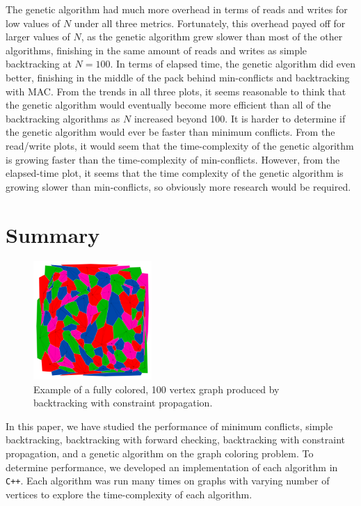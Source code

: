 \documentclass{article}
\begin{document}
		The genetic algorithm had much more overhead in terms of reads and writes for low values of $N$ under all three metrics. Fortunately, this overhead payed off for larger values of $N$, as the genetic algorithm grew slower than most of the other algorithms, finishing in the same amount of reads and writes as simple backtracking at $N=100$. In terms of elapsed time, the genetic algorithm did even better, finishing in the middle of the pack behind min-conflicts and backtracking with MAC. From the trends in all three plots, it seems reasonable to think that the genetic algorithm would eventually become more efficient than all of the backtracking algorithms as $N$ increased beyond 100. It is harder to determine if the genetic algorithm would ever be faster than minimum conflicts. From the read/write plots, it would seem that the time-complexity of the genetic algorithm is growing faster than the time-complexity of min-conflicts. However, from the elapsed-time plot, it seems that the time complexity of the genetic algorithm is growing slower than min-conflicts, so obviously more research would be required.
	
\section{Summary}

	\begin{figure}[h!]
		\centering
		\includegraphics[width=0.4\textwidth]{images/colored_example}
		\caption{Example of a fully colored, 100 vertex graph produced by backtracking with constraint propagation.}
	\end{figure}
	
	In this paper, we have studied the performance of minimum conflicts, simple backtracking, backtracking with forward checking, backtracking with constraint propagation, and a genetic algorithm on the graph coloring problem. To determine performance, we developed an implementation of each algorithm in \texttt{C++}. Each algorithm was run many times on graphs with varying number of vertices to explore the time-complexity of each algorithm. 
	
\end{document}
